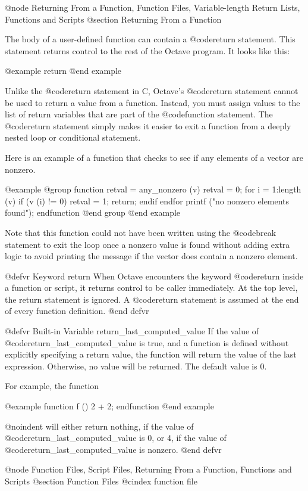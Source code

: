 @node Returning From a Function, Function Files, Variable-length Return Lists, Functions and Scripts
@section Returning From a Function

The body of a user-defined function can contain a @code{return} statement.
This statement returns control to the rest of the Octave program.  It
looks like this:

@example
return
@end example

Unlike the @code{return} statement in C, Octave's @code{return}
statement cannot be used to return a value from a function.  Instead,
you must assign values to the list of return variables that are part of
the @code{function} statement.  The @code{return} statement simply makes
it easier to exit a function from a deeply nested loop or conditional
statement.

Here is an example of a function that checks to see if any elements of a
vector are nonzero.

@example
@group
function retval = any_nonzero (v)
  retval = 0;
  for i = 1:length (v)
    if (v (i) != 0)
      retval = 1;
      return;
    endif
  endfor
  printf ("no nonzero elements found\n");
endfunction
@end group
@end example

Note that this function could not have been written using the
@code{break} statement to exit the loop once a nonzero value is found
without adding extra logic to avoid printing the message if the vector
does contain a nonzero element.

@defvr {Keyword} return
When Octave encounters the keyword @code{return} inside a function or
script, it returns control to be caller immediately.  At the top level,
the return statement is ignored.  A @code{return} statement is assumed
at the end of every function definition.
@end defvr

@defvr {Built-in Variable} return_last_computed_value
If the value of @code{return_last_computed_value} is true, and a
function is defined without explicitly specifying a return value, the
function will return the value of the last expression.  Otherwise, no
value will be returned.  The default value is 0.

For example, the function

@example
function f ()
  2 + 2;
endfunction
@end example

@noindent
will either return nothing, if the value of
@code{return_last_computed_value} is 0, or 4, if the value of
@code{return_last_computed_value} is nonzero.
@end defvr

@node Function Files, Script Files, Returning From a Function, Functions and Scripts
@section Function Files
@cindex function file

